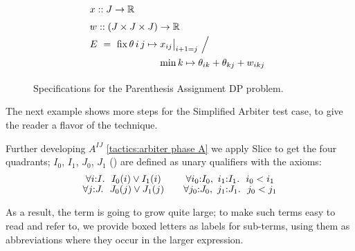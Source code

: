 \begin{figure}
\[
  \renewcommand\arraystretch{1.5}
  \begin{array}{@{}l@{}l}
    \lspan2{x :: J\to\R} \\
    \lspan2{w :: (J\times J\times J)\to\R} \\
    E ~=~ \fix \theta\,i\,j\mapsto{}
      & {x_{ij}\big|_{i+1=j} ~\Big/~} \\
      & \min k\mapsto\theta_{ik}+\theta_{kj}+w_{ikj} \\
  \end{array}
\]
\caption{\label{evaluation:paren spec}
  Specifications for the Parenthesis Assignment DP problem.}
\end{figure}

\medskip
The next example shows more steps for the Simplified Arbiter test case,
to give the reader a flavor of the technique.

\exampleTitle

Further developing $A^{IJ}$ \eqref{tactics:arbiter phase A}
we apply Slice to get the four quadrants; $I_0$, $I_1$, $J_0$, $J_1$
() are defined as unary qualifiers with the axioms:
\[
\begin{array}{c@{\qquad}c}
  \forall i{:}I.~~I_0(i)\lor I_1(i)   &    \forall i_0{:}I_0,~i_1{:}I_1.~~i_0<i_1 \\
  \forall j{:}J.~~J_0(j)\lor J_1(j)   &    \forall j_0{:}J_0,~j_1{:}J_1.~~j_0<j_1 \\
\end{array}
\]

As a result, the term is
going to grow quite large; to make such terms easy to read and refer to, we provide
boxed letters as labels for sub-terms, using them as abbreviations where they
occur in the larger expression.

\makeatletter
\newcommand{\quadrants@normal}[4]{
  \renewcommand\arraystretch{1.5}
   \begin{array}{c|c}
     #1 & #2 \\ \hline
     #3 & #4
   \end{array}}
\newcommand{\quadrants@small}[4]{
  \renewcommand\arraystretch{0.9}
   \begin{array}{@{~}c@{~}|@{~}c@{~}}
     \scriptstyle #1 & \scriptstyle #2 \\ \hline
     \scriptstyle #3 & \scriptstyle #4
   \end{array}}
\newcommand\quadrants{\@ifstar\quadrants@small\quadrants@normal}
\makeatother


